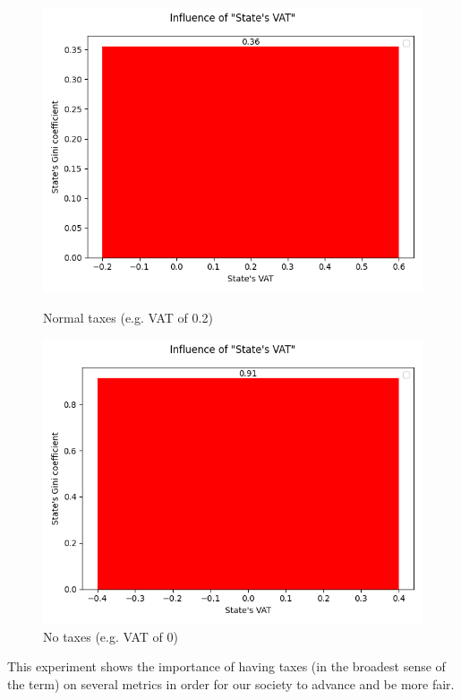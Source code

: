     \begin{figure}[H]
            \includegraphics[width=\linewidth]{img/exp/0_1_3.png}
            \caption{Normal taxes (e.g. VAT of 0.2)}
        \endminipage\hfill
            \includegraphics[width=\linewidth]{img/exp/0_2_3.png}
            \caption{No taxes (e.g. VAT of 0)}
        \endminipage\hfill
    \end{figure}

    This experiment shows the importance of having taxes (in the broadest sense of the term) on several metrics in order for our society to advance and be more fair.


    
    
